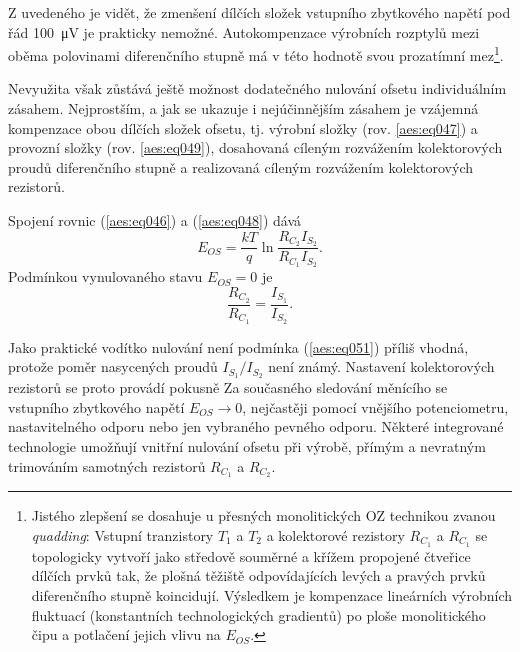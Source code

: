         Z uvedeného je vidět, že zmenšení dílčích složek vstupního zbytkového napětí pod řád
        \SI{100}{\uV} je prakticky nemožné. Autokompenzace výrobních rozptylů mezi oběma polovinami
        diferenčního stupně má v této hodnotě svou prozatímní mez\footnote{Jistého zlepšení se
        dosahuje u přesných monolitických OZ technikou zvanou \emph{quadding}: Vstupní tranzistory
        \(T_1\) a \(T_2\) a kolektorové rezistory \(R_{C_1}\) a \(R_{C_1}\) se topologicky vytvoří
        jako středově souměrné a křížem propojené čtveřice dílčích prvků tak, že plošná těžiště
        odpovídajících levých a pravých prvků diferenčního stupně koincidují. Výsledkem je
        kompenzace lineárních výrobních fluktuací (konstantních technologických gradientů) po ploše
        monolitického čipu a potlačení jejich vlivu na \(E_{OS}\).}.

        Nevyužita však zůstává ještě možnost dodatečného nulování ofsetu individuálním zásahem.
        Nejprostším, a jak se ukazuje i nejúčinnějším zásahem je vzájemná kompenzace obou dílčích
        složek ofsetu, tj. výrobní složky (rov. \ref{aes:eq047}) a provozní složky (rov.
        \ref{aes:eq049}), dosahovaná cíleným rozvážením kolektorových proudů diferenčního stupně a
        realizovaná cíleným rozvážením kolektorových rezistorů.

        Spojení rovnic (\ref{aes:eq046}) a (\ref{aes:eq048}) dává
        \begin{equation}\label{aes:eq050}
          E_{OS} = \dfrac{kT}{q}\ln\dfrac{R_{C_2}I_{S_2}}{R_{C_1}I_{S_2}}.
        \end{equation}
        Podmínkou vynulovaného stavu \(E_{OS} = 0\) je
        \begin{equation}\label{aes:eq051} 
          \dfrac{R_{C_2}}{R_{C_1}} = \dfrac{I_{S_1}}{I_{S_2}}.
        \end{equation}

        Jako praktické vodítko nulování není podmínka (\ref{aes:eq051}) příliš vhodná, protože
        poměr nasycených proudů \(I_{S_1}/I_{S_2}\) není známý. Nastavení kolektorových rezistorů
        se proto provádí pokusně Za současného sledování měnícího se vstupního zbytkového napětí
        \(E_{OS}\rightarrow0\), nejčastěji pomocí vnějšího potenciometru, nastavitelného odporu nebo
        jen vybraného pevného odporu. Některé integrované technologie umožňují vnitřní nulování
        ofsetu při výrobě, přímým a nevratným trimováním samotných rezistorů \(R_{C_1}\) a
        \(R_{C_2}\).
        
